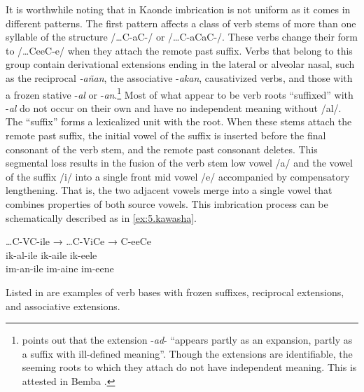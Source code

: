 \documentclass[output=paper]{langsci/langscibook}
\begin{document}
It is worthwhile noting that in Kaonde imbrication is not uniform as it comes in different patterns. The first pattern affects a class of verb stems of more than one syllable of the structure /…C-aC-/ or /…C-aCaC-/. These verbs change their form to /…CeeC-e/ when they attach the remote past suffix. Verbs that belong to this group contain derivational extensions ending in the lateral or alveolar nasal, such as the reciprocal \textit{-añan}, the associative -\textit{akan}, causativized verbs, and those with a frozen stative -\textit{al} or -\textit{an}.\footnote{\citet[90]{meeussen1967} points out that the extension -\textit{ad}- “appears partly as an expansion, partly as a suffix with ill-defined meaning”. Though the extensions are identifiable, the seeming roots to which they attach do not have independent meaning. This is attested in Bemba \citep{hyman1995}.} Most of what appear to be verb roots “suffixed” with -\textit{al} do not occur on their own and have no independent meaning without /al/. The “suffix” forms a lexicalized unit with the root. When these stems attach the remote past suffix, the initial vowel of the suffix is inserted before the final consonant of the verb stem, and the remote past consonant deletes. This segmental loss results in the fusion of the verb stem low vowel /a/ and the vowel of the suffix /i/ into a single front mid vowel /e/ accompanied by compensatory lengthening. That is, the two adjacent vowels merge into a single vowel that combines properties of both source vowels. This imbrication process can be schematically described as in \ref{ex:5.kawasha}.

\ea
\label{ex:5.kawasha}
 …C-VC-ile  →  …C-ViCe  →  C-eeCe  \\
\gll  ik-al-ile    ik-aile    ik-eele\\
 im-an-ile    im-aine    im-eene\\

\z

Listed in  are examples of verb bases with frozen suffixes, reciprocal extensions, and associative extensions.
\end{document}
